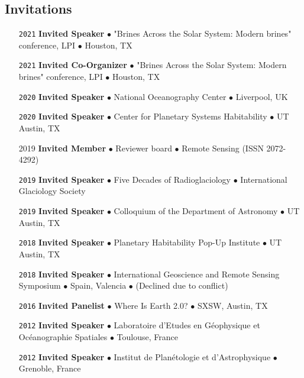 \vspace{-1.5em}
\subsection*{Invitations}

\begin{itemize}[leftmargin=3.8em, labelsep=1.5em]
    \setlength\itemsep{-.5em}
    \item[\texttt{2021}] \textbf{Invited Speaker} $\bullet$ "Brines Across the Solar System: Modern brines" conference, LPI $\bullet$ Houston, TX
    \item[\texttt{2021}] \textbf{Invited Co-Organizer} $\bullet$ "Brines Across the Solar System: Modern brines" conference, LPI $\bullet$ Houston, TX
    \item[\texttt{2020}] \textbf{Invited Speaker} $\bullet$ National Oceanography Center $\bullet$ Liverpool, UK
    \item[\texttt{2020}] \textbf{Invited Speaker} $\bullet$ Center for Planetary Systems Habitability $\bullet$ UT Austin, TX
    \item[2019] \textbf{Invited Member} $\bullet$ Reviewer board $\bullet$ Remote Sensing (ISSN 2072-4292)
    \item[\texttt{2019}] \textbf{Invited Speaker} $\bullet$ Five Decades of Radioglaciology $\bullet$ International Glaciology Society
    \item[\texttt{2019}] \textbf{Invited Speaker} $\bullet$ Colloquium of the Department of Astronomy $\bullet$ UT Austin, TX
    \item[\texttt{2018}] \textbf{Invited Speaker} $\bullet$ Planetary Habitability Pop-Up Institute $\bullet$ UT Austin, TX
    \item[\texttt{2018}] \textbf{Invited Speaker} $\bullet$ International Geoscience and Remote Sensing Symposium $\bullet$ Spain, Valencia $\bullet$ (Declined due to conflict)
    \item[\texttt{2016}] \textbf{Invited Panelist} $\bullet$ Where Is Earth 2.0? $\bullet$ SXSW, Austin, TX
    \item[\texttt{2012}] \textbf{Invited Speaker} $\bullet$ Laboratoire d'Etudes en Géophysique et Océanographie Spatiales $\bullet$ Toulouse, France
    \item[\texttt{2012}] \textbf{Invited Speaker} $\bullet$ Institut de Planétologie et d'Astrophysique $\bullet$ Grenoble, France
\end{itemize}